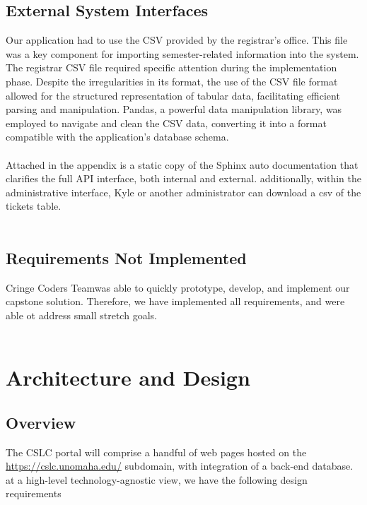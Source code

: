 \documentclass[oneside,openany,obeyspaces]{book}
\newcommand\tab[1][1cm]{\hspace*{#1}}
\newcommand\TeamName{Cringe Coders Team}
\begin{document}
\begin{flushleft}
    \section{External System Interfaces}

    \tab Our application had to use the CSV provided by the registrar's office. This file was a key component for importing semester-related information into the system. The registrar CSV file required specific attention during the implementation phase. Despite the irregularities in its format, the use of the CSV file format allowed for the structured representation of tabular data, facilitating efficient parsing and manipulation. Pandas, a powerful data manipulation library, was employed to navigate and clean the CSV data, converting it into a format compatible with the application's database schema. \\~\\

    \tab Attached in the appendix is a static copy of the Sphinx auto documentation that clarifies the full API interface, both internal and external. additionally, within the administrative interface, Kyle or another administrator can download a csv of the tickets table.\\~\\


    \section{Requirements Not Implemented}

    \tab \TeamName\space was able to quickly prototype, develop, and implement our capstone solution. Therefore, we have implemented all requirements, and were able ot address small stretch goals.\\~\\




    \chapter{Architecture and Design} \label{chp:Architecture and Design}

    \section{Overview}

    \tab The CSLC portal will comprise a handful of web pages hosted on the \url{https://cslc.unomaha.edu/} subdomain, with integration of a back-end database. at a high-level technology-agnostic view, we have the following design requirements\\~\\


\end{flushleft}
\end{document}
